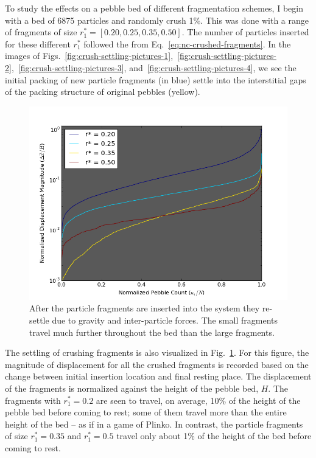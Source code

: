 To study the effects on a pebble bed of different fragmentation schemes, I begin with a bed of \num{6875} particles and randomly crush 1\%. This was done with a range of fragments of size $r_1^* = [0.20, 0.25, 0.35, 0.50]$. The number of particles inserted for these different $r_1^*$ followed the from Eq.~\ref{eq:nc-crushed-fragments}. In the images of Figs.~\ref{fig:crush-settling-pictures-1},~\ref{fig:crush-settling-pictures-2},~\ref{fig:crush-settling-pictures-3}, and~\ref{fig:crush-settling-pictures-4}, we see the initial packing of new particle fragments (in blue) settle into the interstitial gaps of the packing structure of original pebbles (yellow).

\begin{figure}[!t]
\centering
    \includegraphics[width=\singleimagewidth]{chapters/figures/crush-fragments/displacement-scatter-radius-ratios.png}
    \caption{After the particle fragments are inserted into the system they re-settle due to gravity and inter-particle forces. The small fragments travel much further throughout the bed than the large fragments.}
    \label{fig:displacement-scatter}
\end{figure}

The settling of crushing fragments is also visualized in Fig.~\ref{fig:displacement-scatter}. For this figure, the magnitude of displacement for all the crushed fragments is recorded based on the change between initial insertion location and final resting place. The displacement of the fragments is normalized against the height of the pebble bed, $H$. The fragments with $r_1^* = 0.2$ are seen to travel, on average, 10\% of the height of the pebble bed before coming to rest; some of them travel more than the entire height of the bed -- as if in a game of Plinko. In contrast, the particle fragments of size $r_1^* = 0.35$ and $r_1^* = 0.5$ travel only about 1\% of the height of the bed before coming to rest. 

